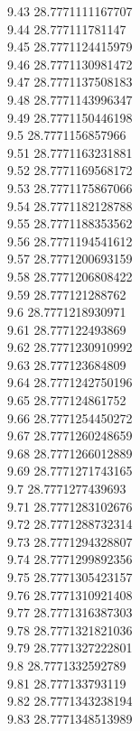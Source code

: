 {9.43	28.7771111167707\\
9.44	28.777111781147\\
9.45	28.7771124415979\\
9.46	28.7771130981472\\
9.47	28.7771137508183\\
9.48	28.7771143996347\\
9.49	28.7771150446198\\
9.5	28.7771156857966\\
9.51	28.7771163231881\\
9.52	28.7771169568172\\
9.53	28.7771175867066\\
9.54	28.7771182128788\\
9.55	28.7771188353562\\
9.56	28.7771194541612\\
9.57	28.7771200693159\\
9.58	28.7771206808422\\
9.59	28.777121288762\\
9.6	28.7771218930971\\
9.61	28.777122493869\\
9.62	28.7771230910992\\
9.63	28.777123684809\\
9.64	28.7771242750196\\
9.65	28.777124861752\\
9.66	28.7771254450272\\
9.67	28.7771260248659\\
9.68	28.7771266012889\\
9.69	28.7771271743165\\
9.7	28.7771277439693\\
9.71	28.7771283102676\\
9.72	28.7771288732314\\
9.73	28.7771294328807\\
9.74	28.7771299892356\\
9.75	28.7771305423157\\
9.76	28.7771310921408\\
9.77	28.7771316387303\\
9.78	28.7771321821036\\
9.79	28.7771327222801\\
9.8	28.7771332592789\\
9.81	28.777133793119\\
9.82	28.7771343238194\\
9.83	28.7771348513989\\
}
